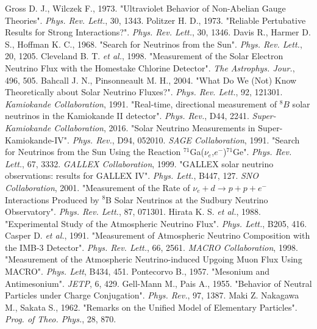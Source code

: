 \documentclass[english]{article}
\begin{document}
\begin{thebibliography}{99}
    Gross D. J., Wilczek F., 1973. "Ultraviolet Behavior of Non-Abelian Gauge Theories". \textit{Phys. Rev. Lett.}, 30, 1343.
    Politzer H. D., 1973. "Reliable Pertubative Results for Strong Interactions?". \textit{Phys. Rev. Lett.}, 30, 1346.
    Davis R., Harmer D. S., Hoffman K. C., 1968. "Search for Neutrinos from the Sun". \textit{Phys. Rev. Lett.}, 20, 1205.
    Cleveland B. T. \textit{et al.}, 1998. "Measurement of the Solar Electron Neutrino Flux with the Homestake Chlorine Detector". \textit{The Astrophys. Jour.}, 496, 505.
    Bahcall J. N., Pinsonneault M. H., 2004. "What Do We (Not) Know Theoretically about Solar Neutrino Fluxes?". \textit{Phys. Rev. Lett.}, 92, 121301.
    \textit{Kamiokande Collaboration}, 1991. "Real-time, directional measurement of ${}^{8} B$ solar neutrinos in the Kamiokande II detector". \textit{Phys. Rev.}, D44, 2241.
    \textit{Super-Kamiokande Collaboration}, 2016. "Solar Neutrino Measurements in Super-Kamiokande-IV". \textit{Phys. Rev.}, D94, 052010.
    \textit{SAGE Collaboration}, 1991. "Search for Neutrinos from the Sun Using the Reaction ${}^{71}$Ga($\nu_{e}$,$e^{-}$)${}^{71}$Ge". \textit{Phys. Rev. Lett.}, 67, 3332.
    \textit{GALLEX Collaboration}, 1999. "GALLEX solar neutrino observations: results for GALLEX IV". \textit{Phys. Lett.}, B447, 127.
    \textit{SNO Collaboration}, 2001. "Measurement of the Rate of $\nu_{e} +d \rightarrow p+p+e^{-}$ Interactions Produced by ${}^{8}$B Solar Neutrinos at the Sudbury Neutrino Observatory". \textit{Phys. Rev. Lett.}, 87, 071301.
    Hirata K. S. \textit{et al.}, 1988. "Experimental Study of the Atmospheric Neutrino Flux". \textit{Phys. Lett.}, B205, 416.
    Casper D. \textit{et al.}, 1991. "Measurement of Atmospheric Neutrino Composition with the IMB-3 Detector". \textit{Phys. Rev. Lett.}, 66, 2561.
    \textit{MACRO Collaboration}, 1998. "Measurement of the Atmospheric Neutrino-induced Upgoing Muon Flux Using MACRO". \textit{Phys. Lett}, B434, 451.
    Pontecorvo B., 1957. "Mesonium and Antimesonium". \textit{JETP}, 6, 429.
    Gell-Mann M., Pais A., 1955. "Behavior of Neutral Particles under Charge Conjugation". \textit{Phys. Rev.}, 97, 1387.
    Maki Z. Nakagawa M., Sakata S., 1962. "Remarks on the Unified Model of Elementary Particles". \textit{Prog. of Theo. Phys.}, 28, 870.

\end{thebibliography}
\end{document}
